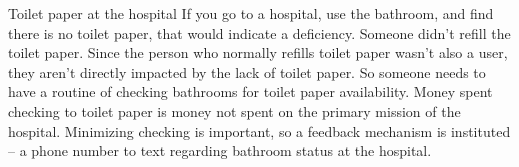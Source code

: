 Toilet paper at the hospital
If you go to a hospital, use the bathroom, and find there is no toilet paper, that would indicate a deficiency.
Someone didn't refill the toilet paper. Since the person who normally refills toilet paper wasn't also a user, they aren't directly impacted by the lack of toilet paper.
So someone needs to have a routine of checking bathrooms for toilet paper availability. Money spent checking to toilet paper is money not spent on the primary mission of the hospital.
Minimizing checking is important, so a feedback mechanism is instituted -- a phone number to text regarding bathroom status at the hospital.
